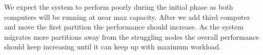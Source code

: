 We expect the system to perform poorly during the initial phase as both computers will be running at near max capacity. After we add third computer and move the first partition the performance should increase. As the system migrates more partitions away from the struggling nodes the overall performance should keep increasing until it can keep up with maximum workload. 











